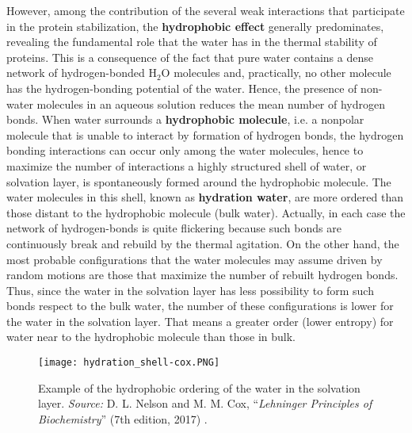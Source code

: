 However, among the contribution of the several weak interactions that participate in the protein stabilization, the \textbf{hydrophobic effect} generally predominates, revealing the fundamental role that the water has in the thermal stability of proteins. This is a consequence of the fact that pure water contains a dense network of hydrogen-bonded H$_2$O molecules and, practically, no other molecule has the hydrogen-bonding potential of the water. Hence, the presence of non-water molecules in an aqueous solution reduces the mean number of hydrogen bonds. When water surrounds a \textbf{hydrophobic molecule}, i.e. a nonpolar molecule that is unable to interact by formation of hydrogen bonds, the hydrogen bonding interactions can occur only among the water molecules, hence to maximize the number of interactions a highly structured shell of water, or solvation layer, is spontaneously formed around the hydrophobic molecule. The water molecules in this shell, known as \textbf{hydration water},
 are more ordered than those distant to the hydrophobic molecule (bulk water). Actually, in each case the network of hydrogen-bonds is quite flickering because such bonds are continuously break and rebuild by the thermal agitation. On the other hand, the most probable configurations that the water molecules may assume driven by random motions are those that maximize the number of rebuilt hydrogen bonds. Thus, since the water in the solvation layer has less possibility to form such bonds respect to the bulk water, the number of these configurations is lower for the water in the solvation layer. That means a greater order (lower entropy) for water near to the hydrophobic molecule than those in bulk.
\begin{figure}[h]
\centering
\begin{minipage}[t]{0.8\textwidth}
\centering
\texttt{[image: hydration\_shell-cox.PNG]}

\caption{\small{Example of the hydrophobic ordering of the water in the solvation layer.
    \textit{Source:} D. L. Nelson and M. M. Cox, ``\textit{Lehninger Principles of Biochemistry}'' (7th edition, 2017) 
    \cite{nelson2017lehninger}.}
}

\label{fig:ss-bond}
\end{minipage} 
\end{figure}

